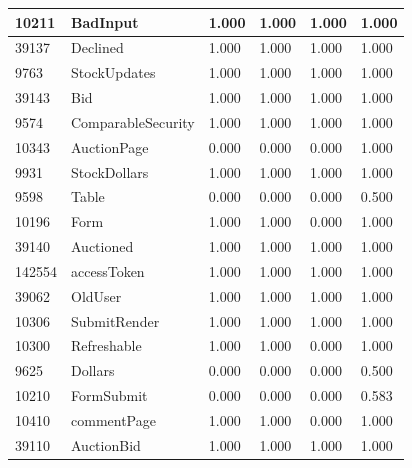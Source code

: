 \documentclass[a4paper]{article}
\newlength{\DUtablewidth} %
\begin{document}
\begin{longtable*}[c]{|p{0.160\DUtablewidth}|p{0.160\DUtablewidth}|p{0.160\DUtablewidth}|p{0.160\DUtablewidth}|p{0.160\DUtablewidth}|p{0.160\DUtablewidth}|}
10211
 & 
BadInput
 & 
1.000
 & 
1.000
 & 
1.000
 & 
1.000
 \\
\hline

39137
 & 
Declined
 & 
1.000
 & 
1.000
 & 
1.000
 & 
1.000
 \\
\hline

9763
 & 
StockUpdates
 & 
1.000
 & 
1.000
 & 
1.000
 & 
1.000
 \\
\hline

39143
 & 
Bid
 & 
1.000
 & 
1.000
 & 
1.000
 & 
1.000
 \\
\hline

9574
 & 
ComparableSecurity
 & 
1.000
 & 
1.000
 & 
1.000
 & 
1.000
 \\
\hline

10343
 & 
AuctionPage
 & 
0.000
 & 
0.000
 & 
0.000
 & 
1.000
 \\
\hline

9931
 & 
StockDollars
 & 
1.000
 & 
1.000
 & 
1.000
 & 
1.000
 \\
\hline

9598
 & 
Table
 & 
0.000
 & 
0.000
 & 
0.000
 & 
0.500
 \\
\hline

10196
 & 
Form
 & 
1.000
 & 
1.000
 & 
0.000
 & 
1.000
 \\
\hline

39140
 & 
Auctioned
 & 
1.000
 & 
1.000
 & 
1.000
 & 
1.000
 \\
\hline

142554
 & 
accessToken
 & 
1.000
 & 
1.000
 & 
1.000
 & 
1.000
 \\
\hline

39062
 & 
OldUser
 & 
1.000
 & 
1.000
 & 
1.000
 & 
1.000
 \\
\hline

10306
 & 
SubmitRender
 & 
1.000
 & 
1.000
 & 
1.000
 & 
1.000
 \\
\hline

10300
 & 
Refreshable
 & 
1.000
 & 
1.000
 & 
0.000
 & 
1.000
 \\
\hline

9625
 & 
Dollars
 & 
0.000
 & 
0.000
 & 
0.000
 & 
0.500
 \\
\hline

10210
 & 
FormSubmit
 & 
0.000
 & 
0.000
 & 
0.000
 & 
0.583
 \\
\hline

10410
 & 
commentPage
 & 
1.000
 & 
1.000
 & 
0.000
 & 
1.000
 \\
\hline

39110
 & 
AuctionBid
 & 
1.000
 & 
1.000
 & 
1.000
 & 
1.000
 \\
\hline


\end{longtable*}
\end{document}
